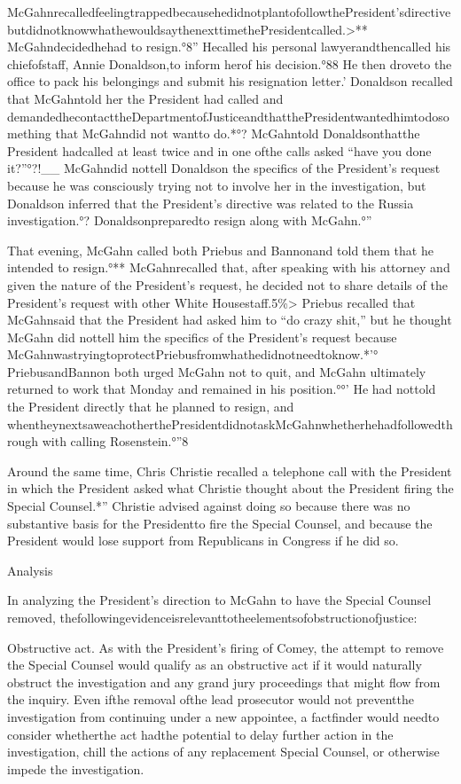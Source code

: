 {McGahnrecalledfeelingtrappedbecausehedidnotplantofollowthePresident’sdirective butdidnotknowwhathewouldsaythenexttimethePresidentcalled.>**
McGahndecidedhehad to resign.°8”
Hecalled his personal lawyerandthencalled his chiefofstaff, Annie Donaldson,to inform herof his decision.°88
He then droveto the office to pack his belongings and submit his resignation letter.’
Donaldson recalled that McGahntold her the President had called and demandedhecontacttheDepartmentofJusticeandthatthePresidentwantedhimtodosomething that McGahndid not wantto do.*°?
McGahntold Donaldsonthatthe President hadcalled at least twice and in one ofthe calls asked “have you done it?”°?!__
McGahndid nottell Donaldson the specifics of the President’s request because he was consciously trying not to involve her in the investigation, but Donaldson inferred that the President’s directive was related to the Russia investigation.°?
Donaldsonpreparedto resign along with McGahn.°”

That evening, McGahn called both Priebus and Bannonand told them that he intended to resign.°**
McGahnrecalled that, after speaking with his attorney and given the nature of the President’s request, he decided not to share details of the President’s request with other White Housestaff.5\%>
Priebus recalled that McGahnsaid that the President had asked him to “do crazy shit,” but he thought McGahn did nottell him the specifics of the President’s request because McGahnwastryingtoprotectPriebusfromwhathedidnotneedtoknow.*’°
PriebusandBannon both urged McGahn not to quit, and McGahn ultimately returned to work that Monday and remained in his position.°°’
He had nottold the President directly that he planned to resign, and whentheynextsaweachotherthePresidentdidnotaskMcGahnwhetherhehadfollowedthrough with calling Rosenstein.°”8

Around the same time, Chris Christie recalled a telephone call with the President in which the President asked what Christie thought about the President firing the Special Counsel.*”
Christie advised against doing so because there was no substantive basis for the Presidentto fire the Special Counsel, and because the President would lose support from Republicans in Congress if he did so.%

Analysis

In analyzing the President’s direction to McGahn to have the Special Counsel removed, thefollowingevidenceisrelevanttotheelementsofobstructionofjustice:

Obstructive act.
As with the President’s firing of Comey, the attempt to remove the Special Counsel would qualify as an obstructive act if it would naturally obstruct the investigation and any grand jury proceedings that might flow from the inquiry.
Even ifthe removal ofthe lead prosecutor would not preventthe investigation from continuing under a new appointee, a factfinder would needto consider whetherthe act hadthe potential to delay further action in the investigation, chill the actions of any replacement Special Counsel, or otherwise impede the investigation.

}
